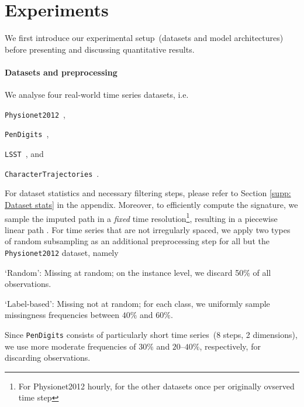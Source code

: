 \documentclass{article}
\begin{document}


\section{Experiments}

We first introduce our experimental setup~(datasets and model
architectures) before presenting and discussing quantitative results.

\paragraph{Datasets and preprocessing}

We analyse four real-world time series datasets, i.e.\
%
\begin{inparaenum}[(i)]
  \item \texttt{Physionet2012}~\citep{goldberger2000physiobank},
  \item \texttt{PenDigits}~\citep{Dua2019},
  \item \texttt{LSST}~\citep{allam2018photometric}, and
  \item \texttt{CharacterTrajectories}~\citep{Dua2019}.
\end{inparaenum}
%
For dataset statistics and necessary filtering steps, please refer to Section \ref{supp: Dataset stats} in the appendix.
Moreover, to efficiently compute the signature, we
sample the imputed path in a \emph{fixed} time resolution\footnote{For Physionet2012 hourly, for the other datasets once per originally ovserved time step}, resulting in
a piecewise linear path . \newline
For time series that are not irregularly spaced, we apply two types of random subsampling as an additional
preprocessing step for all but the \texttt{Physionet2012} dataset,
namely
\begin{inparaenum}[(1)]
    \item `Random': Missing at random; on the instance level, we discard 50\% of all observations.
    \item `Label-based': Missing not at random; for each
      class, we uniformly sample missingness frequencies between $40\%$
      and $60\%$.
\end{inparaenum}
%
Since \texttt{PenDigits} consists of particularly short time series~(8
steps, 2 dimensions), we use more moderate frequencies of $30\%$
and $20$--$40\%$, respectively, for discarding observations.
\end{document}
